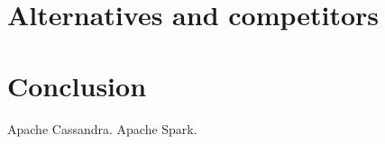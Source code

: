 \documentclass[a4paper, 10 pt, conference]{IEEEtran}
\begin{document}
\section{Alternatives and competitors}

\section{Conclusion}


\addtolength{\textheight}{-12cm}  %

\begin{thebibliography}{99}
 Apache Cassandra.
 Apache Spark.
\end{thebibliography}
\end{document}

